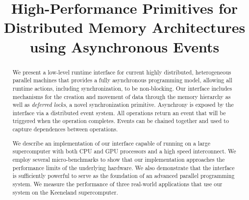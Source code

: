 \documentclass[9pt,nocopyrightspace,preprint]{sigplanconf}
\begin{document}
\title{High-Performance Primitives for Distributed Memory Architectures using Asynchronous Events}
\authorinfo{}{}{}
\maketitle

\begin{abstract}
We present a low-level runtime interface for current highly distributed, heterogeneous
parallel machines that provides a fully asynchronous 
programming model, allowing all runtime actions, including synchronization,
to be non-blocking.  Our interface includes mechanisms for the creation and movement
of data through the memory hierarchy as well as {\em deferred locks}, a novel synchronization primitive.
Asynchrony is exposed by the interface via a distributed event system.  All
operations return an event that will be triggered when the operation completes.  Events
can be chained together and used to capture dependences between operations.

We describe an implementation of our interface capable of running on
a large supercomputer with both CPU and GPU processors and a high speed interconnect.
We employ several micro-benchmarks to show that our implementation approaches
the performance limits of the underlying hardware.
We also demonstrate that the interface is sufficiently powerful to serve as the foundation 
of an advanced parallel programming system.  We measure the performance of three real-world applications
that use our system on the Keeneland supercomputer.
\end{abstract}

%









{

}
\end{document}
